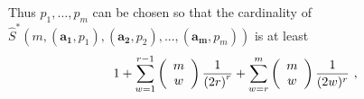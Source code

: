 Thus $p_1, \ldots, p_m$ can be chosen so that the cardinality of
$\hat{S}^*\left(m,(\mathbf{a_1},p_1),(\mathbf{a_2},p_2),...,(\mathbf{a_m},p_m)\right)$
is at least
\begin{equation}\label{up1}1+\sum_{w=1}^{r-1} \left(
\begin{array}{c}
                            m \\
                             w \\
                           \end{array}
                           \right) {\large \frac{1}{\left(2r\right)^r}} +\sum_{w=r}^m \left(
\begin{array}{c}
                            m \\
                             w \\
                           \end{array}
                           \right) \frac{1}{(2w)^r}~,
\end{equation}

